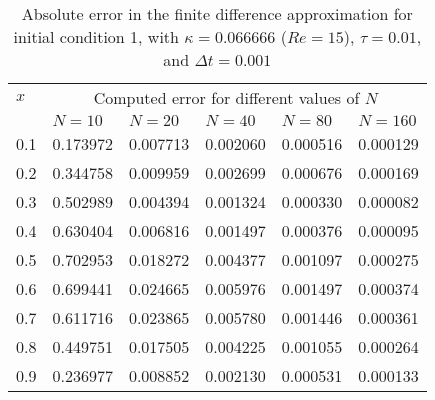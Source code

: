 \documentclass[undefended]{sfuthesis}
\begin{document}
\begin{table}[!h]%
	\centering
	\begin{threeparttable}
		\caption{Absolute error in the finite difference approximation for initial condition 1, with $\kappa = 0.066666$ ($Re = 15$), $\tau = 0.01$, and $\Delta t = 0.001$}
		\begin{tabular}{p{.13\linewidth} p{.15\linewidth} p{.15\linewidth} p{.15\linewidth} p{.15\linewidth} p{.1\linewidth}}
			\toprule
			$x$ & \multicolumn{5}{c}{Computed error for different values of $N$} \\
			\cmidrule{2-6}
			& $N = 10$ & $N = 20$ & $N = 40$ & $N = 80$ & $N = 160$ \\
			\midrule
			0.1 & 0.173972 & 0.007713 & 0.002060 & 0.000516 & 0.000129 \\
			0.2 & 0.344758 & 0.009959 & 0.002699 & 0.000676 & 0.000169 \\
			0.3 & 0.502989 & 0.004394 & 0.001324 & 0.000330 & 0.000082 \\
			0.4 & 0.630404 & 0.006816 & 0.001497 & 0.000376 & 0.000095 \\
			0.5 & 0.702953 & 0.018272 & 0.004377 & 0.001097 & 0.000275 \\
			0.6 & 0.699441 & 0.024665 & 0.005976 & 0.001497 & 0.000374 \\
			0.7 & 0.611716 & 0.023865 & 0.005780 & 0.001446 & 0.000361 \\
			0.8 & 0.449751 & 0.017505 & 0.004225 & 0.001055 & 0.000264 \\
			0.9 & 0.236977 & 0.008852 & 0.002130 & 0.000531 & 0.000133 \\
			\bottomrule
		\end{tabular}
	\end{threeparttable}
\end{table}
\end{document}
